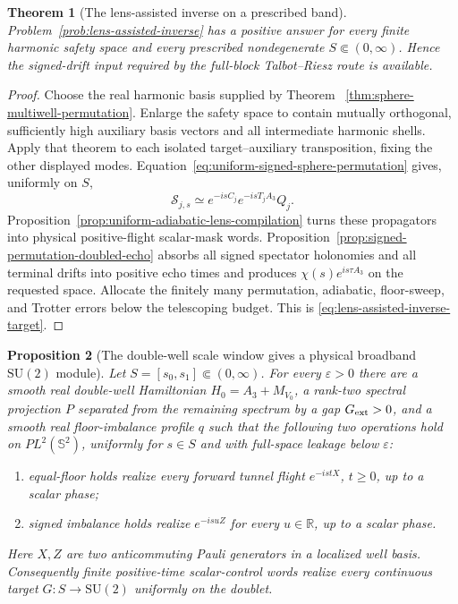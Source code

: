\documentclass[11pt]{article}
\newtheorem{theorem}{Theorem}[section]
\newtheorem{proposition}[theorem]{Proposition}
\theoremstyle{remark}
\begin{document}
\begin{theorem}[The lens-assisted inverse on a prescribed band]
\label{thm:wall-swap-closes-lens}
Problem~\ref{prob:lens-assisted-inverse} has a positive answer for every
finite harmonic safety space and every prescribed nondegenerate
$S\Subset(0,\infty)$.  Hence the signed-drift input required by the
full-block Talbot--Riesz route is available.
\end{theorem}

\begin{proof}
Choose the real harmonic basis supplied by Theorem
~\ref{thm:sphere-multiwell-permutation}.  Enlarge the safety space to contain
mutually orthogonal, sufficiently high auxiliary basis vectors and all
intermediate harmonic shells.  Apply that theorem to each isolated
target--auxiliary transposition, fixing the other displayed modes.
Equation~\eqref{eq:uniform-signed-sphere-permutation} gives, uniformly on
$S$,
\[
 \mathcal S_{j,s}
 \simeq e^{-isC_j}e^{-isT_jA_3}Q_j .
\]
Proposition~\ref{prop:uniform-adiabatic-lens-compilation} turns these
propagators into physical positive-flight scalar-mask words.
Proposition~\ref{prop:signed-permutation-doubled-echo} absorbs all signed
spectator holonomies and all terminal drifts into positive echo times and
produces
$\chi(s)e^{is\tau A_3}$ on the requested space.  Allocate the finitely
many permutation, adiabatic, floor-sweep, and Trotter errors below the
telescoping budget.  This is
\eqref{eq:lens-assisted-inverse-target}.
\end{proof}

\begin{proposition}[The double-well scale window gives a physical broadband
$\mathrm{SU}(2)$ module]
\label{prop:double-well-broadband-su2}
Let $S=[s_0,s_1]\Subset(0,\infty)$.  For every $\varepsilon>0$ there are a
smooth real double-well Hamiltonian $H_0=A_3+M_{V_0}$, a rank-two spectral
projection $P$ separated from the remaining spectrum by a gap
$G_{\rm ext}>0$, and a smooth real floor-imbalance profile $q$ such that the
following two operations hold on $P L^2(\mathbb S^2)$, uniformly for
$s\in S$ and with full-space leakage below $\varepsilon$:
\begin{enumerate}
\item equal-floor holds realize every forward tunnel flight
$e^{-istX}$, $t\geq0$, up to a scalar phase;
\item signed imbalance holds realize $e^{-isuZ}$ for every
$u\in\mathbb R$, up to a scalar phase.
\end{enumerate}
Here $X,Z$ are two anticommuting Pauli generators in a localized well basis.
Consequently finite positive-time scalar-control words realize every
continuous target $G:S\to\mathrm{SU}(2)$ uniformly on the doublet.
\end{proposition}
\end{document}
